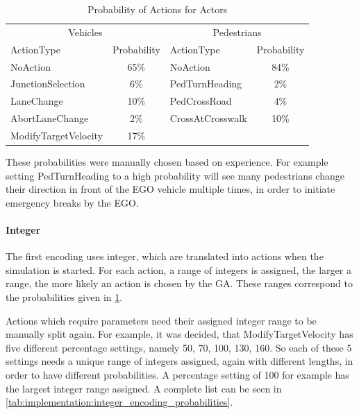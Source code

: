 \begin{table}[ht]
	\centering
	\begin{tabular}{lc|lc}
		\hline
		\multicolumn{2}{c|}{Vehicles} & \multicolumn{2}{c}{Pedestrians} \\
		ActionType & Probability & ActionType & Probability \\
		\hline
		NoAction & 65\% & NoAction & 84\% \\
		JunctionSelection & 6\% & PedTurnHeading & 2\% \\
		LaneChange & 10\% & PedCrossRoad & 4\% \\
		AbortLaneChange & 2\% & CrossAtCrosswalk & 10\% \\
		ModifyTargetVelocity & 17\% & & \\
		\hline
	\end{tabular}
	\caption{Probability of Actions for Actors}
	\label{tab:implementation:action_probabilities}
\end{table}

These probabilities were manually chosen based on experience. For example setting PedTurnHeading to a high probability will see many pedestrians change their direction in front of the EGO vehicle multiple times, in order to initiate emergency breaks by the EGO. 

\paragraph{Integer}
The first encoding uses integer, which are translated into actions when the simulation is started. For each action, a range of integers is assigned, the larger a range, the more likely an action is chosen by the GA. These ranges correspond to the probabilities given in \ref{tab:implementation:action_probabilities}.

Actions which require parameters need their assigned integer range to be manually split again. For example, it was decided, that ModifyTargetVelocity has five different percentage settings, namely 50, 70, 100, 130, 160. So each of these 5 settings needs a unique range of integers assigned, again with different lengths, in order to have different probabilities. A percentage setting of 100 for example has the largest integer range assigned. A complete list can be seen in \ref{tab:implementation:integer_encoding_probabilities}.

